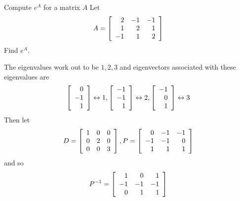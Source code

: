\begin{example}{Compute $e^A$ for a matrix $A$}{}
Let
\begin{equation*}
A=\left[
\begin{array}{rrr}
2 & -1 & -1 \\
1 & 2 & 1 \\
-1 & 1 & 2
\end{array}
\right]
\end{equation*}
Find $e^{A}$.
\end{example}

\begin{solution}
The eigenvalues work out to be $1,2,3$ and eigenvectors associated with these
eigenvalues are 
\begin{equation*}
\left[ 
\begin{array}{r}
0 \\ 
-1 \\ 
1
\end{array}
\right] \leftrightarrow 1,
\left[ 
\begin{array}{r}
-1 \\ 
-1 \\ 
1
\end{array}
\right] \leftrightarrow 2,\left[ 
\begin{array}{r}
-1 \\ 
0 \\ 
1
\end{array}
\right] \leftrightarrow 3
\end{equation*}
Then let 
\begin{equation*}
D=\left[ 
\begin{array}{rrr}
1 & 0 & 0 \\ 
0 & 2 & 0 \\ 
0 & 0 & 3
\end{array}
\right], P=\left[ 
\begin{array}{rrr}
0 & -1 & -1 \\ 
-1 & -1 & 0 \\ 
1 & 1 & 1
\end{array}
\right]
\end{equation*}
and so 
\begin{equation*}
P^{-1}=\left[ 
\begin{array}{rrr}
1 & 0 & 1 \\ 
-1 & -1 & -1 \\ 
0 & 1 & 1
\end{array}
\right]
\end{equation*}


\end{solution}
